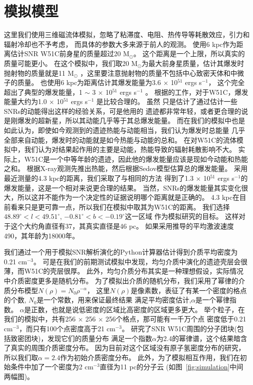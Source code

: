\section{模拟模型}
\label{W51Cmod}
这里我们使用三维磁流体模拟，忽略了粘滞度、电阻、热传导等耗散效应，引力和辐射冷却也不予考虑，
而具体的参数大多来源于前人的观测。
\citet{Sasaki2014}使用6 kpc作为距离估计SNR W51C前身星的质量超过20 M$_\odot$。
这个距离是一个上限，所以真实的质量可能更小。
在这个模拟中，我们取20 M$_\odot$为最大前身星质量，估计其爆发时抛射物的质量就是11 M$_\odot$
\citep{Sukhbold2016}，这里要注意抛射物的质量不包括中心致密天体和中微子的质量。
\citet{Koo1995}也使用6 kpc为距离估计其爆发能量为3.6 $\times$ 10$^{51}$ ergs s$^{-1}$，
这个完全超出了典型的爆发能量，1 $\sim$ 3 $\times$ 10$^{51}$ ergs s$^{-1}$ \citep{Poznanski2013}。
根据\citet{Poznanski2013}的工作，对于W51C，爆发能量大约为1.0 $\times$ 10$^{51}$ ergs s$^{-1}$
是比较合理的。
虽然 \citet{Poznanski2013}只是估计了通过估计一些SNRs的动能得出这样的经验关系，可是他用的
遗迹都非常年轻，或者更合理的说是刚爆发的超新星，所以其动能几乎等于其总爆发能量。
而在我们的模拟中也是如此认为，即使如今观测到的遗迹热能与动能相当，我们认为爆发时总能量
几乎全部来自动能，爆发时的动能就是如今热能与动能的总和。
在对W51C的流体模拟中，我们认为对结果起作用的主要是动能，热能导致的辐射耗散影响不大。
实际上，W51C是一个中等年龄的遗迹，因此他的爆发能量应该是现如今动能和热能之和。
\citet{Koo1995}根据X-ray观测先推出热能，然后根据Sedov模型估算总的爆发能量\citep{1959sdmm.book.....S}。
采用最近测量的4.3 kpc的距离\citep{Tian2013}，我们采取了与\citet{Koo1995}相同的方法
得到了1.3 $\times$ 10$^{51}$ ergs s$^{-1}$的爆发能量，这是一个相对来说更合理的结果。
当然，SNRs的爆发能量其实变化很大，所以这并不能作为一个决定性的证据说明哪个距离就是正确的。
4.3 kpc在目前看来只是更可靠一点，所以我们在模拟中取其为W51C的距离。
我们选择$48.89^{\circ}<l<49.51^{\circ}$, $-0.81^{\circ}<b<-0.19^{\circ}$这一区域
作为模拟研究的目标。
这样对于这个大约角直径有37，其真实直径是46 pc。
如果采用\citet{Koo1995}推导的平均激波速度490\kms，其年龄为18000年。

我们通过一个用于模拟SNR解析演化的Python计算器\citep{Leahy2017a}估计得到介质平均密度为
0.21 cm$^{-3}$。
可是在我们的前期测试模拟中发现，均匀介质中演化的遗迹壳层会很薄，而W51C的壳层很厚。
此外，均匀介质分布其实是一种理想假设，实际情况中介质密度更多是随机分布。
为了模拟出介质的随机分布，我们采用了幂律的介质分布模型$N(\rho) = N_0 \rho^{-\alpha}$，
这里$N(\rho)$是像素数，表征了有某一个密度的格点的个数, $N_0$是一个常数，用来保证最终结果
满足平均密度估计,$\alpha$是一个幂律指数。
$\alpha$是正数，也就是说低密度的区域比高密度的区域更多更大。
举个粒子，在我们的模拟中，共有256 $\times$ 256 $\times$ 256个格点，那可能有一千万个点
密度低于0.21 cm$^{-3}$，而只有100个点密度高于21 cm$^{-3}$。
\citet{Parsons2012} 研究了SNR W51C周围的分子团块(包括致密团块)，发现它们的质量分布
满足一个指数$\alpha$为2.4的幂律谱，这个结果暗含了真实的周围介质密度分布。
因为目前对这个区域没有原子氢密度分布的研究，所以我们取$\alpha=2.4$作为初始介质密度分布。
此外，为了模拟相互作用，我们在初始条件中加了一个密度为2 cm$^{-3}$直径为11 pc的分子云
(如图~\ref{fig:simulation}中间两幅图)。

